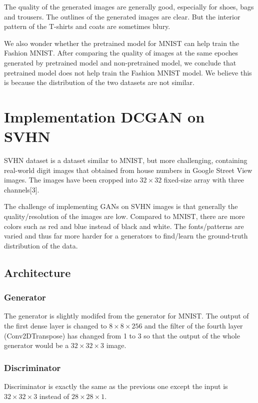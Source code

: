 \documentclass{article}
\begin{document}
The quality of the generated images are generally good, especially for shoes, bags and trousers. The outlines of the generated images are clear. But the interior pattern of the T-shirts and coats are sometimes blury.

We also wonder whether the pretrained model for MNIST can help train the Fashion MNIST. After comparing the quality of images at the same epoches generated by pretrained model and non-pretrained model, we conclude that pretrained model does not help train the Fashion MNIST model. We believe this is because the distribution of the two datasets are not similar.

\section{Implementation DCGAN on SVHN}

SVHN dataset is a dataset similar to MNIST, but more challenging, containing real-world digit images that obtained from house numbers in Google Street View images. The images have been cropped into $32\times 32$ fixed-size array with three channels[3].

The challenge of implementing GANs on SVHN images is that generally the quality/resolution of the images are low. Compared to MNIST, there are more colors such as red and blue instead of black and white. The fonts/patterns are varied and thus far more harder for a generators to find/learn the ground-truth distribution of the data.

\subsection{Architecture}

\subsubsection{Generator}

The generator is slightly modifed from the generator for MNIST. 
The output of the first dense layer is changed to $8\times 8\times 256$ 
and the filter of the fourth layer (Conv2DTranspose) has changed from 1 to 3
so that the output of the whole generator would be a $32\times 32\times 3$ image.

\subsubsection{Discriminator}

Discriminator is exactly the same as the previous one except the input is $32\times 32\times 3$ instead of $28\times 28\times 1$.
\end{document}
